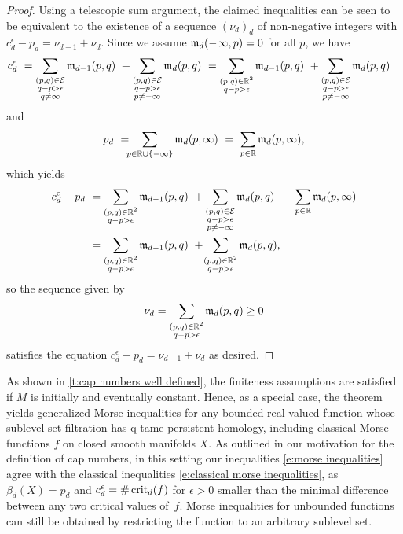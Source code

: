 \begin{proof}
	Using a telescopic sum argument, the claimed inequalities can be seen to be equivalent to the existence of a sequence $(\nu_d)_d$ of non-negative integers with $c_{d}^{\epsilon} - p_{d} = \nu_{d-1} + \nu_{d}$.
	Since we assume $\mathfrak{m}_d(-\infty, p) = 0$ for all $p$, we have
	\begin{align*}
	c_{d}^{\epsilon} \ &=
	\sum_{\substack{(p,q) \in \mathcal{E} \\ q-p > \epsilon \\ q \neq \infty}} \mathfrak{m}_{d-1}(p,q) \ +
	\sum_{\substack{(p,q) \in \mathcal{E} \\ q-p > \epsilon \\ p \neq -\infty}} \mathfrak{m}_d(p,q) \ =
	\sum_{\substack{(p,q) \in \mathbb{R}^2 \\ q-p > \epsilon }} \mathfrak{m}_{d-1}(p,q) \ +
	\sum_{\substack{(p,q) \in \mathcal{E} \\ q-p > \epsilon \\ p \neq -\infty}} \mathfrak{m}_d(p,q)
	\end{align*}
	and
	\begin{equation*}
	p_{d} \ = \!\!\!
	\sum_{p \in \mathbb{R} \cup \{-\infty\}} \mathfrak{m}_d(p,\infty) \ = \
	\sum_{p \in \mathbb{R}} \mathfrak{m}_d(p,\infty),
	\end{equation*}
	which yields
	\begin{align*}
	c_{d}^{\epsilon} - p_{d} \ &=
	\sum_{\substack{(p,q) \in \mathbb{R}^2 \\ q-p > \epsilon}} \mathfrak{m}_{d-1}(p,q) \ +
	\sum_{\substack{(p,q) \in \mathcal{E} \\ q-p > \epsilon \\ p \neq -\infty}} \mathfrak{m}_d(p,q) \ - \
	\sum_{p \in \mathbb{R}} \mathfrak{m}_d(p,\infty) \\ &=
	\sum_{\substack{(p,q) \in \mathbb{R}^2 \\ q-p > \epsilon}} \mathfrak{m}_{d-1}(p,q)
	\ + \!
	\sum_{\substack{(p,q) \in \mathbb{R}^2 \\ q-p > \epsilon}} \mathfrak{m}_d(p,q),
	\end{align*}
	so the sequence given by
	\[\nu_d = \sum_{\substack{(p,q) \in \mathbb{R}^2 \\ q-p > \epsilon}} \mathfrak{m}_d(p,q) \geq 0\]
	satisfies the equation $c_{d}^{\epsilon} - p_{d} = \nu_{d-1} + \nu_{d}$ as desired.
\end{proof}

As shown in \cref{t:cap numbers well defined}, the finiteness assumptions are satisfied if $M$ is initially and eventually constant.
Hence, as a special case, the theorem yields generalized Morse inequalities for any bounded real-valued function whose sublevel set filtration has q-tame persistent homology, including classical Morse functions $f$ on closed smooth manifolds $X$.
As outlined in our motivation for the definition of cap numbers, in this setting our inequalities \eqref{e:morse inequalities} agree with the classical inequalities \eqref{e:classical morse inequalities}, as $\beta_d(X) = p_d$ and $c_d^{\epsilon} = \# \operatorname{crit}_d(f)$ for $\epsilon > 0$ smaller than the minimal difference between any two critical values of~$f$.
Morse inequalities for unbounded functions can still be obtained by restricting the function to an arbitrary sublevel set.

